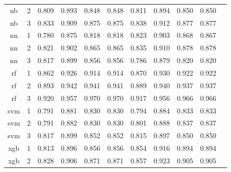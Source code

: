 \documentclass[preprint,12pt]{elsarticle}
\begin{document}
\begin{table}[ht]
{\begin{tabular}{rlrllllllll}
		 \multicolumn{1}{|c|}{nb} & \multicolumn{1}{|c|}{2} & 0.809 & 0.893 & 0.848 & \multicolumn{1}{c|}{0.848} & 0.811 & 0.894 & 0.850 & \multicolumn{1}{c|}{0.850} \\ \cline{1-2}
		 \multicolumn{1}{|c|}{nb} & \multicolumn{1}{|c|}{3} & 0.833 & 0.909 & 0.875 & \multicolumn{1}{c|}{0.875} & 0.838 & 0.912 & 0.877 & \multicolumn{1}{c|}{0.877} \\ \cline{1-2}
		 \multicolumn{1}{|c|}{nn} & \multicolumn{1}{|c|}{1} & 0.780 & 0.875 & 0.818 & \multicolumn{1}{c|}{0.818} & 0.823 & 0.903 & 0.868 & \multicolumn{1}{c|}{0.867} \\ \cline{1-2}
		 \multicolumn{1}{|c|}{nn} & \multicolumn{1}{|c|}{2} & 0.821 & 0.902 & 0.865 & \multicolumn{1}{c|}{0.865} & 0.835 & 0.910 & 0.878 & \multicolumn{1}{c|}{0.878} \\ \cline{1-2}
		 \multicolumn{1}{|c|}{nn} & \multicolumn{1}{|c|}{3} & 0.817 & 0.899 & 0.856 & \multicolumn{1}{c|}{0.856} & 0.786 & 0.879 & 0.820 & \multicolumn{1}{c|}{0.820} \\ \cline{1-2}
		 \multicolumn{1}{|c|}{rf} & \multicolumn{1}{|c|}{1} & 0.862 & 0.926 & 0.914 & \multicolumn{1}{c|}{0.914} & 0.870 & 0.930 & 0.922 & \multicolumn{1}{c|}{0.922} \\ \cline{1-2}
		 \multicolumn{1}{|c|}{rf} & \multicolumn{1}{|c|}{2} & 0.893 & 0.942 & 0.941 & \multicolumn{1}{c|}{0.941} & 0.889 & 0.940 & 0.937 & \multicolumn{1}{c|}{0.937} \\ \cline{1-2}
		 \multicolumn{1}{|c|}{rf} & \multicolumn{1}{|c|}{3} & 0.920 & 0.957 & 0.970& \multicolumn{1}{c|}{0.970} & 0.917 & 0.956 & 0.966 & \multicolumn{1}{c|}{0.966} \\ \cline{1-2}
		 \multicolumn{1}{|c|}{svm} & \multicolumn{1}{|c|}{1} & 0.791 & 0.881 & 0.830 & \multicolumn{1}{c|}{0.830} & 0.794 & 0.884 & 0.833 & \multicolumn{1}{c|}{0.833} \\ \cline{1-2}
		 \multicolumn{1}{|c|}{svm} & \multicolumn{1}{|c|}{2} & 0.791& 0.882 & 0.830 & \multicolumn{1}{c|}{0.830} & 0.801 & 0.888 & 0.837 & \multicolumn{1}{c|}{0.837} \\ \cline{1-2}
		 \multicolumn{1}{|c|}{svm} & \multicolumn{1}{|c|}{3} & 0.817 & 0.899 & 0.852 & \multicolumn{1}{c|}{0.852} & 0.815 & 0.897 & 0.850 & \multicolumn{1}{c|}{0.850} \\  \cline{1-2}
		 \multicolumn{1}{|c|}{xgb} & \multicolumn{1}{|c|}{1} & 0.813 & 0.896 & 0.856 & \multicolumn{1}{c|}{0.856} & 0.854 & 0.916 & 0.894 & \multicolumn{1}{c|}{0.894} \\ \cline{1-2}
		 \multicolumn{1}{|c|}{xgb} & \multicolumn{1}{|c|}{2} & 0.828 & 0.906 & 0.871 & \multicolumn{1}{c|}{0.871}  & 0.857 & 0.923 & 0.905 & \multicolumn{1}{c|}{0.905} \\ \cline{1-2}

\end{tabular}}
\end{table}
\end{document}
